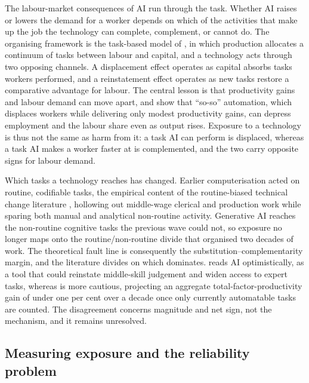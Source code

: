 The labour-market consequences of AI run through the task. Whether AI raises or lowers the demand for a worker depends on which of the activities that make up the job the technology can complete, complement, or cannot do. The organising framework is the task-based model of \citet{acemoglu2019}, in which production allocates a continuum of tasks between labour and capital, and a technology acts through two opposing channels. A displacement effect operates as capital absorbs tasks workers performed, and a reinstatement effect operates as new tasks restore a comparative advantage for labour. The central lesson is that productivity gains and labour demand can move apart, and \citet{acemoglu2020} show that ``so-so'' automation, which displaces workers while delivering only modest productivity gains, can depress employment and the labour share even as output rises. Exposure to a technology is thus not the same as harm from it: a task AI can perform is displaced, whereas a task AI makes a worker faster at is complemented, and the two carry opposite signs for labour demand.

Which tasks a technology reaches has changed. Earlier computerisation acted on routine, codifiable tasks, the empirical content of the routine-biased technical change literature \citep{autor2003, autor2013}, hollowing out middle-wage clerical and production work while sparing both manual and analytical non-routine activity. Generative AI reaches the non-routine cognitive tasks the previous wave could not, so exposure no longer maps onto the routine/non-routine divide that organised two decades of work. The theoretical fault line is consequently the substitution--complementarity margin, and the literature divides on which dominates. \citet{autor2024} reads AI optimistically, as a tool that could reinstate middle-skill judgement and widen access to expert tasks, whereas \citet{acemoglu2025} is more cautious, projecting an aggregate total-factor-productivity gain of under one per cent over a decade once only currently automatable tasks are counted. The disagreement concerns magnitude and net sign, not the mechanism, and it remains unresolved.

\subsection*{Measuring exposure and the reliability problem}

